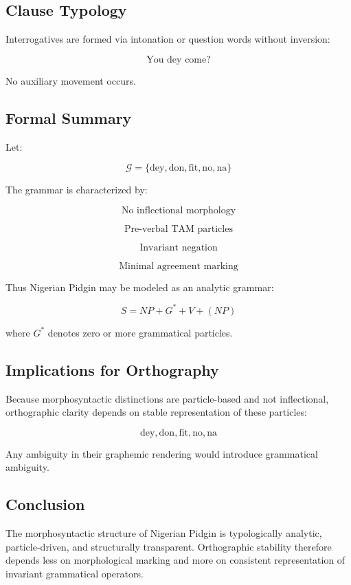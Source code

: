 \documentclass[12pt]{article}
\begin{document}
\subsection{Clause Typology}

Interrogatives are formed via intonation or question words without inversion:

\[
\text{You dey come?}
\]

No auxiliary movement occurs.

\subsection{Formal Summary}

Let:

\[
\mathcal{G} = \{\text{dey}, \text{don}, \text{fit}, \text{no}, \text{na}\}
\]

The grammar is characterized by:

\[
\text{No inflectional morphology}
\]

\[
\text{Pre-verbal TAM particles}
\]

\[
\text{Invariant negation}
\]

\[
\text{Minimal agreement marking}
\]

Thus Nigerian Pidgin may be modeled as an analytic grammar:

\[
S = NP + G^* + V + (NP)
\]

where \( G^* \) denotes zero or more grammatical particles.

\subsection{Implications for Orthography}

Because morphosyntactic distinctions are particle-based and not inflectional, orthographic clarity depends on stable representation of these particles:

\[
\text{dey}, \text{don}, \text{fit}, \text{no}, \text{na}
\]

Any ambiguity in their graphemic rendering would introduce grammatical ambiguity.

\subsection{Conclusion}

The morphosyntactic structure of Nigerian Pidgin is typologically analytic, particle-driven, and structurally transparent. Orthographic stability therefore depends less on morphological marking and more on consistent representation of invariant grammatical operators.
\end{document}
